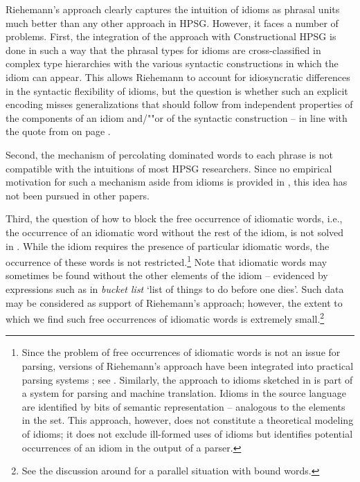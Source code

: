 \documentclass[output=paper,biblatex,babelshorthands,newtxmath,draftmode,colorlinks,citecolor=brown]{langscibook}
\begin{document}
Riehemann's approach clearly captures the intuition of idioms as phrasal units much better than any
other approach in HPSG.  However, it faces a number of problems.  First, the integration of the
approach with Constructional HPSG is done in such a way that the phrasal types for idioms are
cross-classified in complex type hierarchies with the various syntactic constructions in which the
idiom can appear.  This allows Riehemann to account for idiosyncratic differences in the syntactic
flexibility of idioms, but the question is whether such an explicit encoding misses generalizations
that should follow from independent properties of the components of an idiom and/""or of the
syntactic construction -- in line with the quote from \citet{NSW94a} on page \pageref{NSW-quote}.

Second, the mechanism of percolating dominated words to each phrase is not compatible with the
intuitions of most HPSG researchers.  Since no empirical motivation for such a mechanism aside from
idioms is provided in \citet{Riehemann2001a}, this idea has not been pursued in other papers.

Third, the question of how to block the free occurrence of idiomatic words, i.e., the occurrence of
an idiomatic word without the rest of the idiom, is not solved in \citet{Riehemann2001a}. While the
idiom requires the presence of particular idiomatic words, the occurrence of these words is not
restricted.\footnote{Since the problem of free occurrences of idiomatic words is not an issue for
  parsing, versions of Riehemann's approach have been integrated into practical parsing systems
  \citep{Villavicencio:Copestake:02}; see .  Similarly, the approach to idioms
  sketched in \citet{Flickinger:15Slides2} is part of a system for parsing and machine
  translation. Idioms in the source language are identified by bits of
  semantic representation -- analogous to the elements in the  set. This approach,
  however, does not constitute a theoretical modeling of idioms; it does not exclude ill-formed uses
  of idioms but identifies potential occurrences of an idiom in the output of a parser.}  Note that
idiomatic words may sometimes be found without the other elements of the idiom -- evidenced by
expressions such as in \emph{bucket list} `list of things to do before one dies'. Such data may be
considered as support of Riehemann's approach; however, the extent to which we find such free
occurrences of idiomatic words is extremely small.\footnote{See the discussion around 
  for a parallel situation with bound words.}
\end{document}
